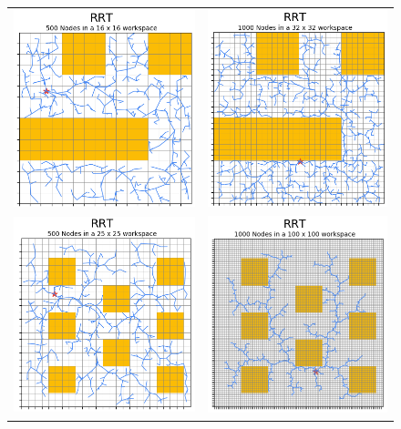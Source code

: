 

\begin{figure}[H]
\begin{center}
\begin{tabular}{c  c}
    \includegraphics[width=0.45\linewidth]{chapters/chapter2/img/rrt_2d_1.png} & \includegraphics[width=0.45\linewidth]{chapters/chapter2/img/rrt_2d_2.png} \\
    \includegraphics[width=0.45\linewidth]{chapters/chapter2/img/rrt_2d_3.png} & \includegraphics[width=0.45\linewidth]{chapters/chapter2/img/rrt_2d_4.png}

\end{tabular}
\end{center}
\end{figure}
